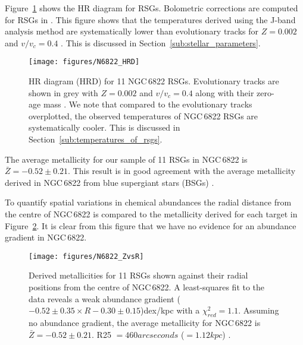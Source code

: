 \documentclass[manuscript]{aastex}
\begin{document}
Figure~\ref{fig:6822HRD} shows the HR diagram for RSGs.
Bolometric corrections are computed for RSGs in
\cite{Davies13a}.
This figure shows that the temperatures derived using the J-band analysis method are systematically lower than evolutionary tracks for
$Z=0.002$ and $v/v_{c} = 0.4$
\citep{2013A&A...558A.103G}.
This is discussed in Section~\ref{sub:stellar_parameters}.


\begin{figure}
\texttt{[image: figures/N6822\_HRD]}
\caption{
HR diagram (HRD) for 11 NGC\,6822 RSGs.
Evolutionary tracks are shown in grey with
$Z=0.002$ and $v/v_{c} = 0.4$ along with their zero-age mass
\protect\citep{2013A&A...558A.103G}.
We note that compared to the evolutionary tracks overplotted,
the observed temperatures of NGC\,6822 RSGs are systematically cooler.
This is discussed in Section~\ref{sub:temperatures_of_rsgs}.
}
\label{fig:6822HRD}
\end{figure}


The average metallicity for our sample of 11 RSGs in NGC\,6822 is
$\bar{Z} = -0.52\pm 0.21$.
This result is in good agreement with the average metallicity derived in
NGC\,6822 from blue supergiant stars (BSGs)
\citep{2001ApJ...547..765V,1999A&A...352L..40M}.


To quantify spatial variations in chemical abundances the radial distance from the centre of
NGC\,6822 is compared to the metallicity derived for each target in
Figure~\ref{fig:ZvsR}.
It is clear from this figure that we have no evidence for an abundance gradient in
NGC\,6822.


\begin{figure}
\texttt{[image: figures/N6822\_ZvsR]}
\caption{
Derived metallicities for 11 RSGs shown against their radial positions from the centre of NGC\,6822.
A least-squares fit to the data reveals a weak abundance gradient
($-0.52\pm 0.35\times R - 0.30\pm 0.15$)dex/kpc with a $\chi^{2}_{red}=1.1$.
Assuming no abundance gradient,
the average metallicity for NGC\,6822 is $\bar{Z} = -0.52\pm 0.21$.
R25 $= 460 arcseconds$ ($=1.12kpc$)
\citep{2012AJ....144....4M}.
         }
\label{fig:ZvsR}
\end{figure}
\end{document}
